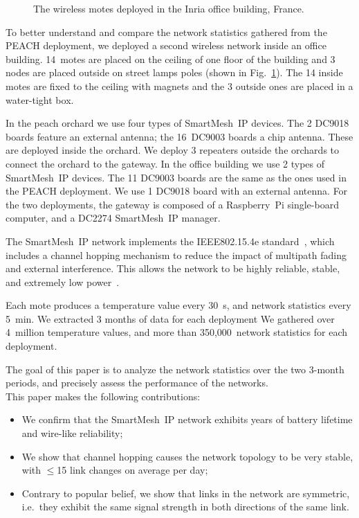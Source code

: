 \documentclass{elsarticle}
\newcommand{\smip}                {SmartMesh~IP\xspace}
\begin{document}
\begin{figure}
\begin{minipage}[b]{0.3\textwidth}
        \caption{The wireless motes deployed in the Inria office building, France.}
        \label{fig:evalab_map}
    \end{minipage}
\end{figure}


To better understand and compare the network statistics gathered from the PEACH deployment, we deployed a second wireless network inside an office building.
14~motes are placed on the ceiling of one floor of the building and 3 nodes are placed outside on street lamps poles (shown in Fig.~\ref{fig:evalab_map}).
The 14 inside motes are fixed to the ceiling with magnets and the 3 outside ones are placed in a water-tight box.


In the peach orchard we use four types of \smip devices.
The 2 DC9018 boards feature an external antenna; the 16~DC9003 boards a chip antenna.
These are deployed inside the orchard.
We deploy 3 repeaters outside the orchards to connect the orchard to the gateway.
In the office building we use 2 types of \smip devices.
The 11 DC9003 boards are the same as the ones used in the PEACH deployment.
We use 1 DC9018 board with an external antenna.
For the two deployments, the gateway is composed of a Raspberry~Pi single-board computer, and a DC2274 \smip manager.


The \smip network implements the IEEE802.15.4e standard~\cite{std_ieee802154e_2012}, which includes a channel hopping mechanism to reduce the impact of multipath fading and external interference.
This allows the network to be highly reliable, stable, and extremely low power~\cite{watteyne10mitigating, watteyne09reliability}.


Each mote produces a temperature value every 30~s, and network statistics every 5~min.
We extracted 3 months of data for each deployment
We gathered over 4~million temperature values, and more than 350,000~network statistics for each deployment.


The goal of this paper is to analyze the network statistics over the two 3-month periods, and precisely assess the performance of the networks.
\\

This paper makes the following contributions:
\begin{itemize}
    \item We confirm that the \smip network exhibits years of battery lifetime and wire-like reliability;
    \item We show that channel hopping causes the network topology to be very stable, with $\leq$15 link changes on average per day;
    \item Contrary to popular belief, we show that links in the network are symmetric, i.e.~they exhibit the same signal strength in both directions of the same link.
\end{itemize}
\end{document}
